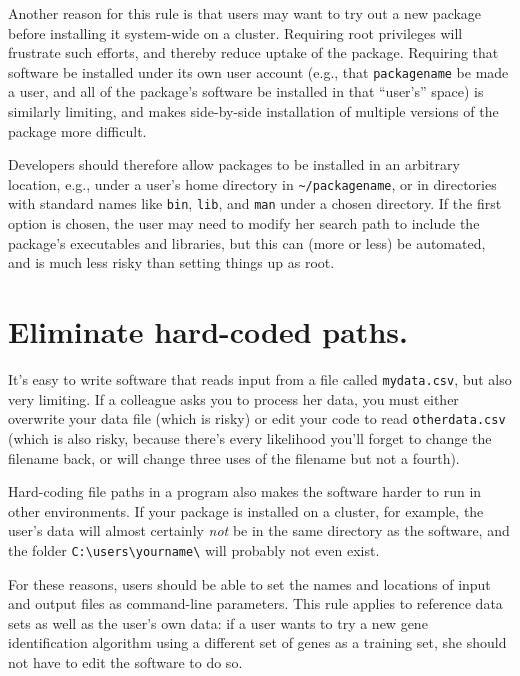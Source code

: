 \documentclass[10pt,letterpaper]{article}
\begin{document}
Another reason for this rule is that users may want to try out a new
package before installing it system-wide on a cluster. Requiring root
privileges will frustrate such efforts, and thereby reduce uptake of the
package. Requiring that software be installed under its own user account
(e.g., that \texttt{packagename} be made a user, and all of the
package's software be installed in that ``user's'' space) is similarly
limiting, and makes side-by-side installation of multiple versions of
the package more difficult.

Developers should therefore allow packages to be installed in an
arbitrary location, e.g., under a user's home directory in
\texttt{\textasciitilde{}/packagename}, or in directories with standard
names like \texttt{bin}, \texttt{lib}, and \texttt{man} under a chosen
directory. If the first option is chosen, the user may need to modify
her search path to include the package's executables and libraries, but
this can (more or less) be automated, and is much less risky than
setting things up as root.

\section{Eliminate hard-coded paths.}

It's easy to write software that reads input from a file called
\texttt{mydata.csv}, but also very limiting. If a colleague asks you to
process her data, you must either overwrite your data file (which is
risky) or edit your code to read \texttt{otherdata.csv} (which is also
risky, because there's every likelihood you'll forget to change the
filename back, or will change three uses of the filename but not a
fourth).

Hard-coding file paths in a program also makes the software harder to run
in other environments. If your package is installed on a cluster, for
example, the user's data will almost certainly \emph{not} be in the same
directory as the software, and the folder
\texttt{C:\textbackslash{}users\textbackslash{}yourname\textbackslash{}}
will probably not even exist.

For these reasons, users should be able to set the names and locations
of input and output files as command-line parameters. This rule applies
to reference data sets as well as the user's own data: if a user wants
to try a new gene identification algorithm using a different set of
genes as a training set, she should not have to edit the software to do
so.
\end{document}
